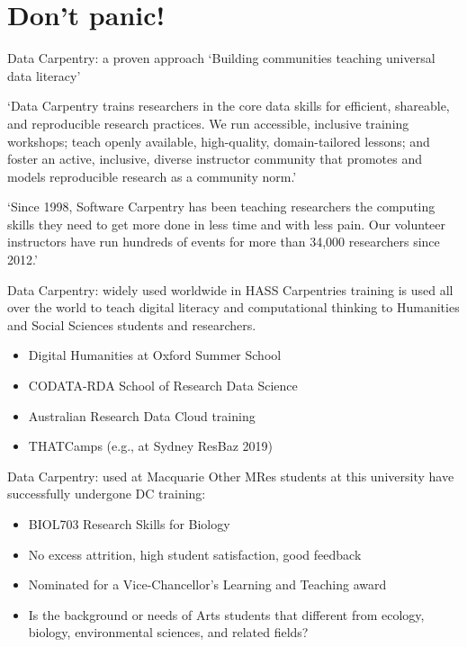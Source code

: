 \documentclass[aspectratio=169, 11pt]{beamer} %
\begin{document}
\section{Don't panic!}

\begin{frame}{Data Carpentry: a proven approach}
    `Building communities teaching universal data literacy'
       
    `Data Carpentry trains researchers in the core data skills for efficient, shareable, and reproducible research practices. We run accessible, inclusive training workshops; teach openly available, high-quality, domain-tailored lessons; and foster an active, inclusive, diverse instructor community that promotes and models reproducible research as a community norm.' \cite{Teal2016-gy}

    `Since 1998, Software Carpentry has been teaching researchers the computing skills they need to get more done in less time and with less pain. Our volunteer instructors have run hundreds of events for more than 34,000 researchers since 2012.' \cite{Duckles2018-fu}
\end{frame}

\begin{frame}{Data Carpentry: widely used worldwide in HASS}
    Carpentries training is used all over the world to teach digital literacy and computational thinking to Humanities and Social Sciences students and researchers.
    \begin{itemize}[label=\textbullet]
        \item Digital Humanities at Oxford Summer School
        \item CODATA-RDA School of Research Data Science
        \item Australian Research Data Cloud training
        \item THATCamps (e.g., at Sydney ResBaz 2019)
    \end{itemize}
\end{frame}

\begin{frame}{Data Carpentry: used at Macquarie}
  Other MRes students at this university have successfully undergone DC training:
    \begin{itemize}[label=\textbullet]
        \item BIOL703 Research Skills for Biology
        \item No excess attrition, high student satisfaction, good feedback
        \item Nominated for a Vice-Chancellor's Learning and Teaching award
        \item Is the background or needs of Arts students that different from ecology, biology, environmental sciences, and related fields?
    \end{itemize}
\end{frame}
\end{document}

